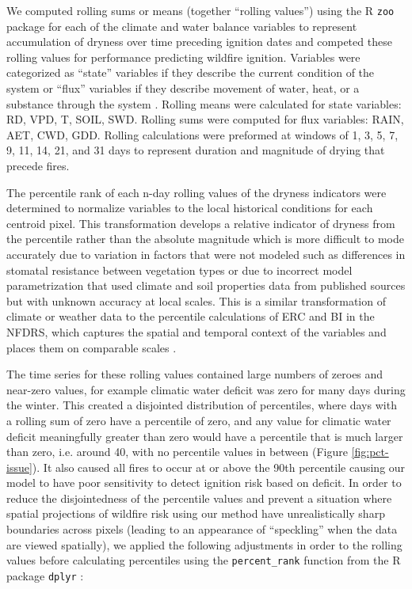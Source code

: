 \documentclass[11p]{article}
\begin{document}
We computed rolling sums or means (together ``rolling values'') using the R \texttt{zoo} package \citep{zeileisZooS3Infrastructure2005} for each of the climate and water balance variables to represent accumulation of dryness over time preceding ignition dates and competed these rolling values for performance predicting wildfire ignition. Variables were categorized as ``state'' variables if they describe the current condition of the system or ``flux'' variables if they describe movement of water, heat, or a substance through the system \citep{wangInterplaysStateFlux2019,dingmanPhysicalHydrology2015}. Rolling means were calculated for state variables: RD, VPD, T, SOIL, SWD. Rolling sums were computed for flux variables: RAIN, AET, CWD, GDD. Rolling calculations were preformed at windows of 1, 3, 5, 7, 9, 11, 14, 21, and 31 days to represent duration and magnitude of drying that precede fires.

The percentile rank of each n-day rolling values of the dryness indicators were determined to normalize variables to the local historical conditions for each centroid pixel. This transformation develops a relative indicator of dryness from the percentile rather than the absolute magnitude which is more difficult to mode accurately due to variation in factors that were not modeled such as differences in stomatal resistance between vegetation types or due to incorrect model parametrization that used climate and soil properties data from published sources but with unknown accuracy at local scales. This is a similar transformation of climate or weather data to the percentile calculations of ERC and BI in the NFDRS, which captures the spatial and temporal context of the variables and places them on comparable scales \citep{jollySevereFireDanger2019}.

The time series for these rolling values contained large numbers of zeroes and near-zero values, for example climatic water deficit was zero for many days during the winter. This created a disjointed distribution of percentiles, where days with a rolling sum of zero have a percentile of zero, and any value for climatic water deficit meaningfully greater than zero would have a percentile that is much larger than zero, i.e. around 40, with no percentile values in between (Figure \ref{fig:pct-issue}). It also caused all fires to occur at or above the 90th percentile causing our model to have poor sensitivity to detect ignition risk based on deficit. In order to reduce the disjointedness of the percentile values and prevent a situation where spatial projections of wildfire risk using our method have unrealistically sharp boundaries across pixels (leading to an appearance of ``speckling'' when the data are viewed spatially), we applied the following adjustments in order to the rolling values before calculating percentiles using the \texttt{percent\_rank} function from the R package \texttt{dplyr} \citep{wickhamWelcomeTidyverse2019}:
\end{document}
